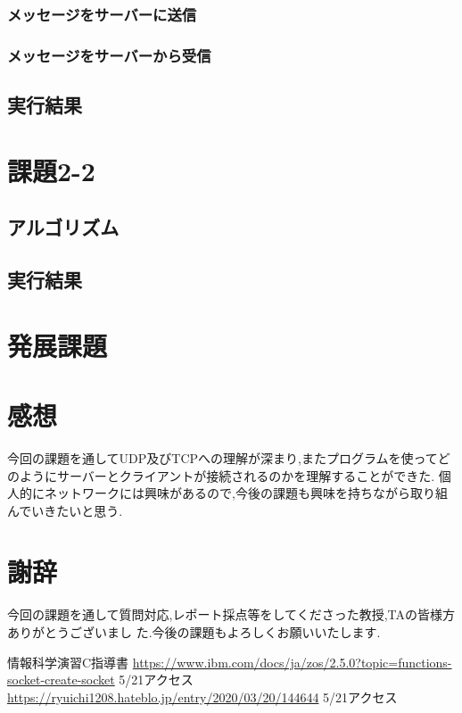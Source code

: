 \documentclass[dvipdfmx]{jarticle}
\begin{document}
\subsubsection{メッセージをサーバーに送信}
\subsubsection{メッセージをサーバーから受信}
\subsection{実行結果}

\section{課題2-2}
\subsection{アルゴリズム}

\subsection{実行結果}

\section{発展課題}

\section{感想}
今回の課題を通してUDP及びTCPへの理解が深まり,またプログラムを使ってどのようにサーバーとクライアントが接続されるのかを理解することができた.
個人的にネットワークには興味があるので,今後の課題も興味を持ちながら取り組んでいきたいと思う.
\section{謝辞}
今回の課題を通して質問対応,レポート採点等をしてくださった教授,TAの皆様方ありがとうございまし
た.今後の課題もよろしくお願いいたします.
\begin{thebibliography}{5}
    情報科学演習C指導書
     \url{https://www.ibm.com/docs/ja/zos/2.5.0?topic=functions-socket-create-socket} 5/21アクセス
     \url{https://ryuichi1208.hateblo.jp/entry/2020/03/20/144644} 5/21アクセス
\end{thebibliography}
\end{document}
